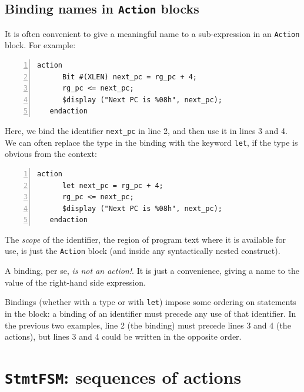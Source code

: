 
\subsection{Binding names in {\tt Action} blocks}


It is often convenient to give a meaningful name to a sub-expression
in an {\tt Action} block.  For example:

{\small
\begin{Verbatim}[frame=single, numbers=left]
   action
      Bit #(XLEN) next_pc = rg_pc + 4;
      rg_pc <= next_pc;
      $display ("Next PC is %08h", next_pc);
   endaction
\end{Verbatim}
}

Here, we bind the identifier \verb|next_pc| in line 2, and then use it
in lines 3 and 4.  We can often replace the type in the binding with
the keyword {\tt let}, if the type is obvious from the context:

{\small
\begin{Verbatim}[frame=single, numbers=left]
   action
      let next_pc = rg_pc + 4;
      rg_pc <= next_pc;
      $display ("Next PC is %08h", next_pc);
   endaction
\end{Verbatim}
}

The \emph{scope} of the identifier, {\ie} the region of program text
where it is available for use, is just the {\tt Action} block (and
inside any syntactically nested construct).

A binding, per se, \emph{is not an action!}.  It is just a
convenience, giving a name to the value of the right-hand side
expression.

Bindings (whether with a type or with \verb|let|) impose some ordering
on statements in the block: a binding of an identifier must precede
any use of that identifier.  In the previous two examples, line 2 (the
binding) must precede lines 3 and 4 (the actions), but lines 3 and 4
could be written in the opposite order.


\section{{\tt StmtFSM}: sequences of actions}

